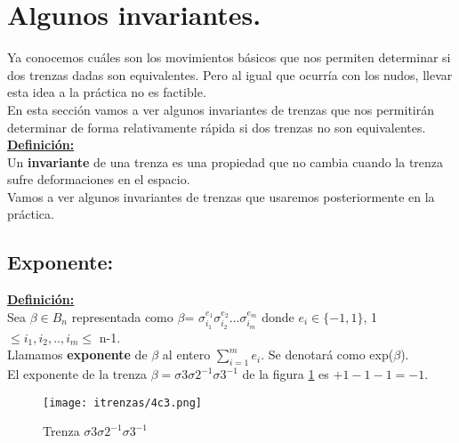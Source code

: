 \bigskip
\section{Algunos invariantes.}
Ya conocemos cuáles son los movimientos básicos que nos permiten determinar si dos trenzas dadas son equivalentes. Pero al igual que ocurría con los nudos, llevar esta idea a la práctica no es factible.\\

En esta sección vamos a ver algunos invariantes de trenzas que nos permitirán determinar de forma relativamente rápida si dos trenzas no son equivalentes.\\

\underline{\textbf{Definición:}} \\
Un \textbf{invariante} de una trenza es una propiedad que no cambia cuando la trenza sufre deformaciones en el espacio. \\

Vamos a ver algunos invariantes de trenzas que usaremos posteriormente en la práctica.

\bigskip
\subsection{Exponente:}\label{invtren1}
\textbf{\underline{Definición:}}\\
Sea $\beta \in B_{n}$ representada como $\beta $= $\sigma_{i_{1}}^{e_{1}} \sigma_{i_{2}}^{e_{2}} ... \sigma_{i_{m}}^{e_{m}}$ donde $e_{i} \in \{-1,1\}$, 1 $\le i_{1}, i_{2},..,i_{m} \le$ n-1.\\
Llamamos \textbf{exponente} de $\beta$ al entero $ \sum_{i=1}^{m} e_{i} $. Se denotará como exp($\beta$).\\

El exponente de la trenza $\beta = \sigma3\sigma2^{-1}\sigma3^{-1}$ de la figura \ref{exp1} es $+1-1-1=-1$.\\
   \begin{figure}[h!]
   	\centering
   	\texttt{[image: itrenzas/4c3.png]}
   	\caption{Trenza $\sigma3\sigma2^{-1}\sigma3^{-1}$}
   	\label{exp1} 
   \end{figure}

